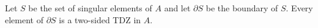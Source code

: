 Let $S$ be the set of singular elements of $A$ and let $\partial S$ be the boundary of $S$. Every element of $\partial S$ is a two-sided TDZ in $A$.

